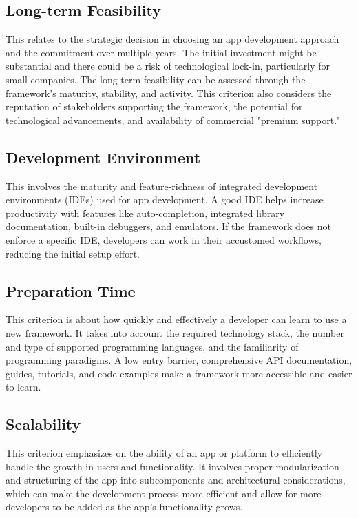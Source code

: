 \subsection{Long-term Feasibility}
This relates to the strategic decision in choosing an app development approach and the commitment over multiple years. The initial investment might be substantial and there could be a risk of technological lock-in, particularly for small companies. The long-term feasibility can be assessed through the framework's maturity, stability, and activity. This criterion also considers the reputation of stakeholders supporting the framework, the potential for technological advancements, and availability of commercial "premium support."

\subsection{Development Environment}
This involves the maturity and feature-richness of integrated development environments (IDEs) used for app development. A good IDE helps increase productivity with features like auto-completion, integrated library documentation, built-in debuggers, and emulators. If the framework does not enforce a specific IDE, developers can work in their accustomed workflows, reducing the initial setup effort.

\subsection{Preparation Time}
This criterion is about how quickly and effectively a developer can learn to use a new framework. It takes into account the required technology stack, the number and type of supported programming languages, and the familiarity of programming paradigms. A low entry barrier, comprehensive API documentation, guides, tutorials, and code examples make a framework more accessible and easier to learn.

\subsection{Scalability}
This criterion emphasizes on the ability of an app or platform to efficiently handle the growth in users and functionality. It involves proper modularization and structuring of the app into subcomponents and architectural considerations, which can make the development process more efficient and allow for more developers to be added as the app's functionality grows.

